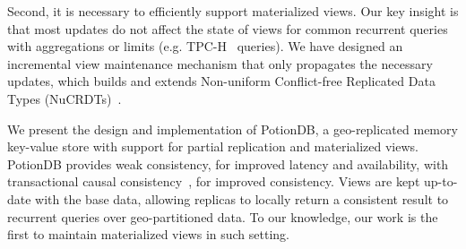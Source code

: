 \documentclass[sigplan,twocolumn,review,anonymous]{acmart}
\begin{document}
Second, it is necessary to efficiently support materialized views. 
Our key insight is that most updates do not affect the state of views for
common recurrent queries with aggregations or limits (e.g. TPC-H~\cite{tpch} queries).
We have designed an incremental view maintenance mechanism that only propagates the
necessary updates, which builds and extends 
Non-uniform Conflict-free Replicated Data Types (NuCRDTs)~\cite{Cabrita17Nonuniform}.






We present the design and implementation of PotionDB, a geo-replicated memory key-value store with support  
for partial replication and materialized views. 
PotionDB provides weak consistency, for improved latency and availability,  with transactional 
causal consistency~\cite{cure}, for improved consistency.
Views are kept up-to-date with the base data, allowing replicas to locally return a consistent result to 
recurrent queries over geo-partitioned data.
To our knowledge, our work is the first to maintain materialized views in such setting.  
\end{document}
